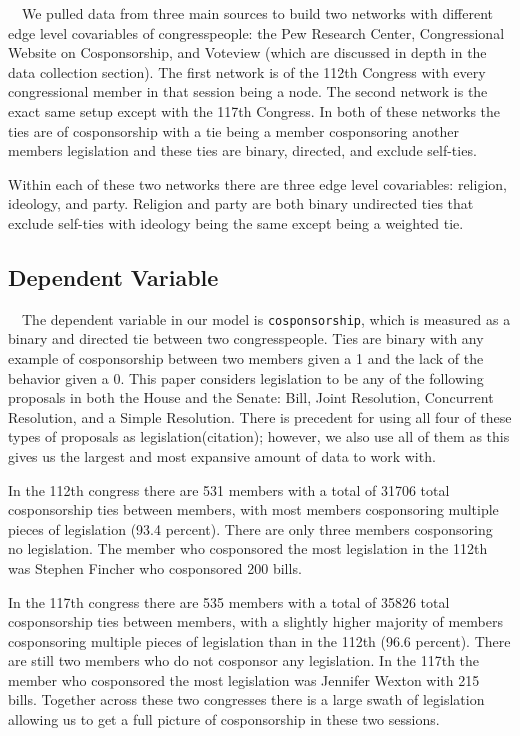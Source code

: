 \documentclass[Royal,times,sageh]{sagej}
\begin{document}
\doublespacing

~~We pulled data from three main sources to build two networks with
different edge level covariables of congresspeople: the Pew Research
Center, Congressional Website on Cosponsorship, and Voteview (which are
discussed in depth in the data collection section). The first network is
of the 112th Congress with every congressional member in that session
being a node. The second network is the exact same setup except with the
117th Congress. In both of these networks the ties are of cosponsorship
with a tie being a member cosponsoring another members legislation and
these ties are binary, directed, and exclude self-ties.

Within each of these two networks there are three edge level
covariables: religion, ideology, and party. Religion and party are both
binary undirected ties that exclude self-ties with ideology being the
same except being a weighted tie.

\hypertarget{dependent-variable}{%
\subsection{Dependent Variable}\label{dependent-variable}}

\doublespacing

~~The dependent variable in our model is \texttt{cosponsorship}, which
is measured as a binary and directed tie between two congresspeople.
Ties are binary with any example of cosponsorship between two members
given a 1 and the lack of the behavior given a 0. This paper considers
legislation to be any of the following proposals in both the House and
the Senate: Bill, Joint Resolution, Concurrent Resolution, and a Simple
Resolution. There is precedent for using all four of these types of
proposals as legislation(citation); however, we also use all of them as
this gives us the largest and most expansive amount of data to work
with.

In the 112th congress there are 531 members with a total of 31706 total
cosponsorship ties between members, with most members cosponsoring
multiple pieces of legislation (93.4 percent). There are only three
members cosponsoring no legislation. The member who cosponsored the most
legislation in the 112th was Stephen Fincher who cosponsored 200 bills.

In the 117th congress there are 535 members with a total of 35826 total
cosponsorship ties between members, with a slightly higher majority of
members cosponsoring multiple pieces of legislation than in the 112th
(96.6 percent). There are still two members who do not cosponsor any
legislation. In the 117th the member who cosponsored the most
legislation was Jennifer Wexton with 215 bills. Together across these
two congresses there is a large swath of legislation allowing us to get
a full picture of cosponsorship in these two sessions.
\end{document}
